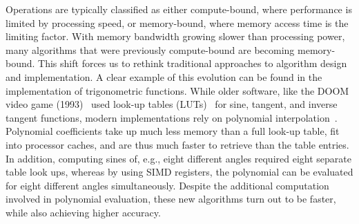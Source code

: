 \normalcaptionwidth
\captionwidth{\linewidth}
\begin{figure}[h]
    \centering

    \hspace{0.025\textwidth}%
    \begin{minipage}[t]{0.42\textwidth}
      \centering
      \label{fig:in:memory-wall}
    \label{man}
    \end{minipage}%
    \hspace{0.03\textwidth}%
    \begin{minipage}[t]{0.42\textwidth}
      \centering
      \label{fig:in:nvidia-gpus}
    \end{minipage}%
\end{figure}
\changecaptionwidth
{}

Operations are typically classified as either compute-bound, where performance is limited by processing speed, or memory-bound, where memory access time is the limiting factor. With memory bandwidth growing slower than processing power, many algorithms that were previously compute-bound are becoming memory-bound. This shift forces us to rethink traditional approaches to algorithm design and implementation. A clear example of this evolution can be found in the implementation of trigonometric functions. While older software, like the DOOM video game (1993)~ used look-up tables (LUTs)~ for sine, tangent, and inverse tangent functions, modern implementations rely on polynomial interpolation~. Polynomial coefficients take up much less memory than a full look-up table, fit into processor caches, and are thus much faster to retrieve than the table entries. In addition, computing sines of, e.g., eight different angles required eight separate table look ups, whereas by using SIMD registers, the polynomial can be evaluated for eight different angles simultaneously. Despite the additional computation involved in polynomial evaluation, these new algorithms turn out to be faster, while also achieving higher accuracy.

